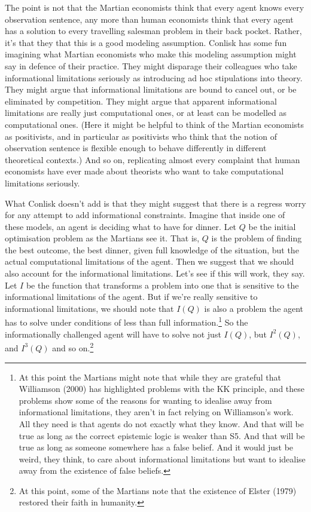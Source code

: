 \documentclass[
  12pt,
]{article}
\begin{document}
The point is not that the Martian economists think that every agent knows every observation sentence, any more than human economists think that every agent has a solution to every travelling salesman problem in their back pocket. Rather, it's that they that this is a good modeling assumption. Conlisk has some fun imagining what Martian economists who make this modeling assumption might say in defence of their practice. They might disparage their colleagues who take informational limitations seriously as introducing ad hoc stipulations into theory. They might argue that informational limitations are bound to cancel out, or be eliminated by competition. They might argue that apparent informational limitations are really just computational ones, or at least can be modelled as computational ones. (Here it might be helpful to think of the Martian economists as positivists, and in particular as positivists who think that the notion of observation sentence is flexible enough to behave differently in different theoretical contexts.) And so on, replicating almost every complaint that human economists have ever made about theorists who want to take computational limitations seriously.

What Conlisk doesn't add is that they might suggest that there is a regress worry for any attempt to add informational constraints. Imagine that inside one of these models, an agent is deciding what to have for dinner. Let \(Q\) be the initial optimisation problem as the Martians see it. That is, \(Q\) is the problem of finding the best outcome, the best dinner, given full knowledge of the situation, but the actual computational limitations of the agent. Then we suggest that we should also account for the informational limitations. Let's see if this will work, they say. Let \(I\) be the function that transforms a problem into one that is sensitive to the informational limitations of the agent. But if we're really sensitive to informational limitations, we should note that \(I(Q)\) is also a problem the agent has to solve under conditions of less than full information.\footnote{At this point the Martians might note that while they are grateful that Williamson (2000) has highlighted problems with the KK principle, and these problems show some of the reasons for wanting to idealise away from informational limitations, they aren't in fact relying on Williamson's work. All they need is that agents do not exactly what they know. And that will be true as long as the correct epistemic logic is weaker than S5. And that will be true as long as someone somewhere has a false belief. And it would just be weird, they think, to care about informational limitations but want to idealise away from the existence of false beliefs.} So the informationally challenged agent will have to solve not just \(I(Q)\), but \(I^2(Q)\), and \(I^3(Q)\) and so on.\footnote{At this point, some of the Martians note that the existence of Elster (1979) restored their faith in humanity.}
\end{document}
